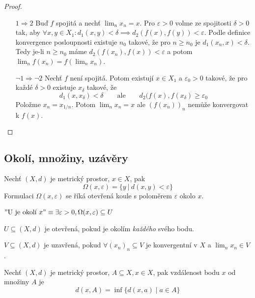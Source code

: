 \documentclass[../main.tex]{subfiles}
\begin{document}
\begin{proof}
	\begin{itemize}
		\item[$1 \Rightarrow 2$] Buď $f$ spojitá a nechť $\lim_nx_n = x$. Pro $\varepsilon > 0$ volme ze spojitosti $\delta > 0$
		tak, aby $\forall x,y \in X_1 : d_1(x,y) <\delta \implies d_2(f(x),f(y)) <\varepsilon$.
		Podle definice konvergence posloupnosti existuje $n_0$ takové, že pro $n \ge n_0$ je $d_1(x_n,x) < \delta$. Tedy je-li $n \ge n_0$
		máme $d_2(f(x_n),f(x)) < \varepsilon$ a potom $\lim_n f(x_n) = f(\lim_n x_n)$.
		\item[$\lnot 1  \Rightarrow  \lnot 2$] Nechť $f$ není spojitá.
		Potom existují $x \in X_1$ a $\varepsilon_0 > 0$ takové, že pro každé $\delta > 0$ existuje $x_\delta$ takové, že
		$$d_1(x, x_\delta) < \delta \qquad \text{ale} \qquad d_2(f(x), f(x_\delta) \ge \varepsilon_0$$
		Položme $x_n = x_{1/n}$. Potom $\lim_n x_n = x$ ale $(f(x_n))_n$ nemůže konvergovat k $f(x)$.
	\end{itemize}
\end{proof}



\subsection{Okolí, množiny, uzávěry}
\begin{definition}[Okolí]
	Nechť $(X,d)$ je metrický prostor, $x\in X$, pak
	$$\Omega (x,\varepsilon) = \{ y\ |\ d(x,y) < \varepsilon \}$$
	Formulaci $\Omega (x,\varepsilon)$ se říká otevřená koule s poloměrem $\varepsilon$ okolo $x$.
\end{definition}

\begin{example} 
	$"\textrm{U je okolí } x" \equiv \exists \varepsilon > 0, \Omega (x,\varepsilon) \subseteq U $
\end{example}

\begin{definition}
	$U \subseteq (X,d)$ je otevřená, pokud je okolím \textit{každého} svého bodu.
\end{definition}

\begin{definition}
	$V \subseteq (X,d)$ je uzavřená, pokud $\forall (x_n)_n \subseteq V$ je konvergentní
	v $X$ a $\lim_n x_n \in V$.
\end{definition}

\begin{definition}
	Nechť $(X,d)$ je metrický prostor, $A \subseteq X, x\in X$, pak vzdálenost bodu $x$ od množiny $A$ je
	\[d(x,A) = \inf\{d(x,a)\mid a \in A\}\]
\end{definition}
\end{document}
